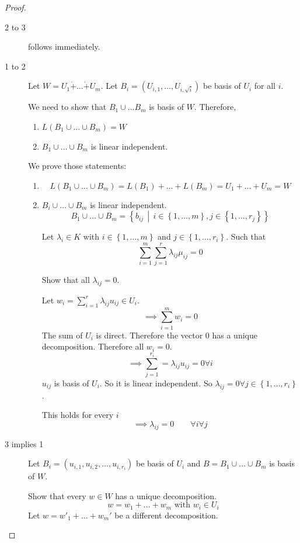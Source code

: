 \documentclass[a4paper,landscape,twocolumn]{article}
\newcommand\set[1]{\left\{#1\right\}}
\newcommand\setdef[2]{\left\{#1\,\middle|\,#2\right\}}
\begin{document}
\begin{proof}
  \begin{description}
    \item[2 to 3] follows immediately.
    \item[1 to 2]
      Let $W = U_1 \dot{+} \dots \dot{+} U_m$.
      Let $B_i = (U_{i,1}, \dots, U_{i,\sqrt{i}})$ be basis of $U_i$ for all $i$.

      We need to show that $B_1 \cup \dots B_m$ is basis of $W$. Therefore,
      \begin{enumerate}
        \item $L(B_1 \cup \dots \cup B_m) = W$
        \item $B_1 \cup \dots \cup B_m$ is linear independent.
      \end{enumerate}
      We prove those statements:
      \begin{enumerate}
        \item \[ L(B_1 \cup \dots \cup B_m) = L(B_1) + \dots + L(B_m) = U_1 + \dots + U_m = W \]
        \item $B_i \cup \dots \cup B_m$ is linear independent.
          \[ B_1 \cup \dots \cup B_m = \setdef{b_{ij}}{i \in \set{1, \dots, m}, j \in \set{1, \dots, r_j}} \]

          Let $\lambda_i \in K$ with $i \in \set{1, \dots, m}$ and $j \in \set{1, \dots, r_i}$.
          Such that
          \[ \sum_{i=1}^m \sum_{j=1}^r \lambda_{ij} \mu_{ij} = 0 \]

          Show that all $\lambda_{ij} = 0$.

          Let $w_i = \sum_{i=1}^r \lambda_{ij} u_{ij} \in U_i$.
          \[ \implies \sum_{i=1}^m w_i = 0 \]
          The sum of $U_i$ is direct.
          Therefore the vector $0$ has a unique decomposition.
          Therefore all $w_i = 0$.
          \[ \implies \sum_{j=1}^{r_i} = \lambda_{ij} u_{ij} = 0 \forall i \]
          $u_{ij}$ is basis of $U_i$.  So it is linear independent.
          So $\lambda_{ij} = 0 \forall j \in \set{1, \dots, r_i}$.

          This holds for every $i$
          \[ \implies \lambda_{ij} = 0 \qquad \forall i \forall j \]
      \end{enumerate}
    \item[3 implies 1]
      Let $B_i = (u_{i,1}, u_{i,2}, \dots, u_{i,r_i})$ be basis of $U_i$
      and $B = B_1 \cup \dots \cup B_m$ is basis of $W$.

      Show that every $w \in W$ has a unique decomposition.
      \[ w = w_1 + \dots + w_m \text{ with } w_i \in U_i \]
      Let $w = w'_1 + \dots + w_m'$ be a different decomposition.


\end{description}
\end{proof}
\end{document}
